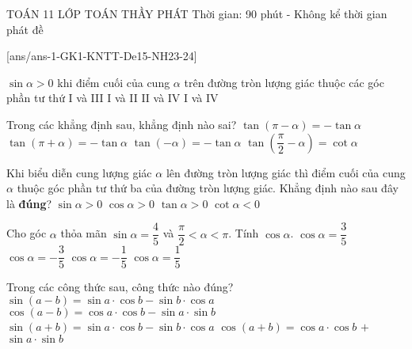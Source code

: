\begin{name}
	{\tenchude}
	{TOÁN 11}
	{LỚP TOÁN THẦY PHÁT}
	{Thời gian: 90 phút - Không kể thời gian phát đề}
\end{name}
\setcounter{ex}{0}\setcounter{bt}{0}
[ans/ans-1-GK1-KNTT-De15-NH23-24]

\begin{ex}%
	$\sin\alpha>0$ khi điểm cuối của cung $\alpha$ trên đường tròn lượng giác thuộc các góc phần tư thứ
	\choice
	{I và III}
	{\True I và II}
	{II và IV}
	{I và IV}
\end{ex}
	\begin{ex}%
	Trong các khẳng định sau, khẳng định nào sai?
	\choice
	{$\tan\left(\pi-\alpha\right)=-\tan\alpha$}
	{\True $\tan\left(\pi+\alpha\right)=-\tan\alpha$}
	{$\tan\left(-\alpha\right)=-\tan\alpha$}
	{$\tan\left(\dfrac{\pi}{2}-\alpha\right)=\cot\alpha$}
\end{ex}
	\begin{ex}%
	Khi biểu diễn cung lượng giác $\alpha$ lên đường tròn lượng giác thì điểm cuối của cung $\alpha$ thuộc góc phần tư thứ ba của đường tròn lượng giác. Khẳng định nào sau đây là \textbf{đúng}?
	\choice
	{$\sin\alpha>0$}
	{$\cos\alpha>0$}
	{\True $\tan\alpha>0$}
	{$\cot\alpha<0$}
\end{ex}
\begin{ex}%
	Cho góc $\alpha$ thỏa mãn $\sin\alpha=\dfrac{4}{5}$ và $\dfrac{\pi}{2}<\alpha<\pi$. Tính $\cos\alpha$.
	\choice
	{$\cos\alpha=\dfrac{3}{5}$}
	{\True $\cos\alpha=-\dfrac{3}{5}$}
	{$\cos\alpha=-\dfrac{1}{5}$}
	{$\cos\alpha=\dfrac{1}{5}$}
\end{ex}
\begin{ex}%
	Trong các công thức sau, công thức nào đúng?
	\choice
	{\True $\sin\left(a-b\right)=\sin a\cdot\cos b-\sin b\cdot\cos a$}
	{$\cos\left(a-b\right)=\cos a\cdot\cos b-\sin a\cdot\sin b$}
	{$\sin\left(a+b\right)=\sin a\cdot\cos b-\sin b\cdot\cos a$}
	{$\cos\left(a+b\right)=\cos a\cdot\cos b$ $+$ $\sin a\cdot\sin b$}
\end{ex}
